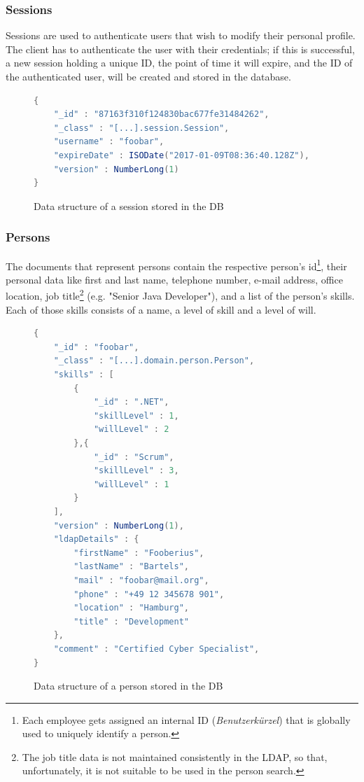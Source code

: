 \subsubsection{Sessions}
Sessions are used to authenticate users that wish to modify their personal profile. The client has to authenticate the user with their credentials; if this is successful, a new session holding a unique ID, the point of time it will expire, and the ID of the authenticated user, will be created and stored in the database.

\begin{figure}[h]
\begin{lstlisting}[language=Java]
{
	"_id" : "87163f310f124830bac677fe31484262",
	"_class" : "[...].session.Session",
	"username" : "foobar",
	"expireDate" : ISODate("2017-01-09T08:36:40.128Z"),
	"version" : NumberLong(1)
}
\end{lstlisting}
\caption[Data Structure: Session]{Data structure of a session stored in the DB}
\end{figure}
\subsubsection{Persons}
\label{db:person}
The documents that represent persons contain the respective person's id\footnote{Each employee gets assigned an internal ID (\textit{Benutzerkürzel}) that is globally used to uniquely identify a person.}, their personal data like first and last name, telephone number, e-mail address, office location, job title\footnote{The job title data is not maintained consistently in the LDAP, so that, unfortunately, it is not suitable to be used in the person search.} (e.g. "Senior Java Developer"), and a list of the person's skills. Each of those skills consists of a name, a level of skill and a level of will.
\begin{figure}[h]
\begin{lstlisting}[language=Java]
{
	"_id" : "foobar",
	"_class" : "[...].domain.person.Person",
	"skills" : [
		{
			"_id" : ".NET",
			"skillLevel" : 1,
			"willLevel" : 2
		},{
			"_id" : "Scrum",
			"skillLevel" : 3,
			"willLevel" : 1
		}
	],
	"version" : NumberLong(1),
	"ldapDetails" : {
		"firstName" : "Fooberius",
		"lastName" : "Bartels",
		"mail" : "foobar@mail.org",
		"phone" : "+49 12 345678 901",
		"location" : "Hamburg",
		"title" : "Development"
	},
	"comment" : "Certified Cyber Specialist",
}
\end{lstlisting}
\caption[Data Structure: Person]{Data structure of a person stored in the DB}
\end{figure}


